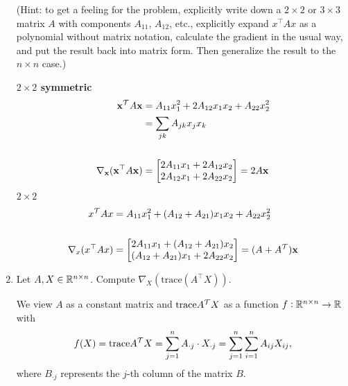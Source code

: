\begin{enumerate}[label=(\alph*)]
    (Hint: to get a feeling for the problem, explicitly write down a $2 \times 2$ or $3 \times 3$ matrix $A$ with components $A_{11}$, $A_{12}$, etc., explicitly expand $x^{\top}Ax$ as a polynomial without matrix notation, calculate the gradient in the usual way, and put the result back into matrix form. Then generalize the result to the $n \times n$ case.)
    \begin{mdframed}
      \textbf{$2 \times 2$ symmetric}
      \begin{align*}
        \mathbf x^\mathcal T A\mathbf x &= A_{11}x_1^2 + 2A_{12}x_1x_2 + A_{22}x_2^2 \\
                  &= \sum_{jk}A_{jk}x_jx_k \\
        \\
        \nabla_\mathbf x(\mathbf x^{\top} A\mathbf x) &=
        \begin{bmatrix}2A_{11}x_1 + 2A_{12}x_2\\2A_{12}x_1 + 2A_{22}x_2\end{bmatrix} = 2A\mathbf x
      \end{align*}
      \textbf{$2 \times 2$}
      \begin{align*}
        x^\mathcal T Ax &= A_{11}x_1^2 + (A_{12} + A_{21})x_1x_2 + A_{22}x_2^2 \\\\
        \nabla_x(x^{\top} Ax) &=
        \begin{bmatrix}2A_{11}x_1 + (A_{12} + A_{21})x_2\\(A_{12} + A_{21})x_1 + 2A_{22}x_2\end{bmatrix} = (A + A^\mathcal T)\mathbf x
      \end{align*}
    \end{mdframed}

    \item Let $A, X \in \mathbb{R}^{n \times n}$. Compute $\nabla_X (\text{trace}(A^{\top}X))$.
    \begin{mdframed}
      We view $A$ as a constant matrix and $\text{trace} A^\mathcal T X$ as a function
      $f:\mathbb{R}^{n \times n} \rightarrow \mathbb{R}$ with
      $$
      f(X)
      = \text{trace} A^\mathcal T X
      = \sum_{j=1}^n A_{\cdot j} \cdot X_{\cdot j}
      = \sum_{j=1}^n \sum_{i=1}^n A_{ij}X_{ij},
      $$
      where $B_{\cdot j}$ represents the $j$-th column of the matrix $B$.


\end{mdframed}
\end{enumerate}
